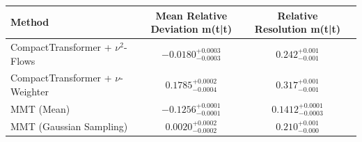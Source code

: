     \begin{tabular}{lccc}
        \toprule
        Method & Mean Relative Deviation m(t\bar{t}) & Relative Resolution m(t\bar{t}) \\
        \midrule
        CompactTransformer + $\nu^2$-Flows & $-0.0180_{-0.0003}^{+0.0003}$ & $0.242_{-0.001}^{+0.001}$ \\
        CompactTransformer + $\nu$-Weighter & $0.1785_{-0.0004}^{+0.0002}$ & $0.317_{-0.001}^{+0.001}$ \\
        MMT (Mean) & $-0.1256_{-0.0001}^{+0.0001}$ & $0.1412_{-0.0003}^{+0.0001}$ \\
        MMT (Gaussian Sampling) & $0.0020_{-0.0002}^{+0.0002}$ & $0.210_{-0.000}^{+0.001}$ \\
        \bottomrule
    \end{tabular}